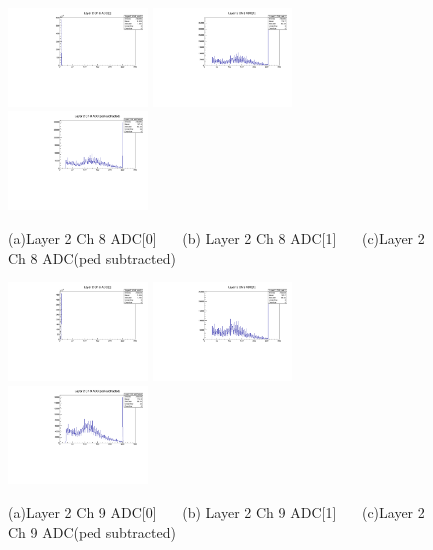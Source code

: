 \documentclass[a4paper,11pt]{article}
\theoremstyle{mytheor}
\begin{document}
\begin{figure}[H] 
\vspace*{-0.3cm} 
\includegraphics[width=0.33\textwidth,scale=0.5,trim=0 0 0 0,clip]{plotsdir/file0_test-Layer2_Ch8_adc0-1.pdf} 
\includegraphics[width=0.33\textwidth,scale=0.5,trim=0 0 0 0,clip]{plotsdir/file0_test-Layer2_Ch8_adc1-1.pdf} 
\includegraphics[width=0.33\textwidth,scale=0.5,trim=0 0 0 0,clip]{plotsdir/file0_test-Layer2_Ch8_adcPedsub-1.pdf} 
\caption{(a)Layer 2 Ch 8 ADC[0] ~~~(b) Layer 2 Ch 8 ADC[1] ~~~(c)Layer 2 Ch 8 ADC(ped subtracted) } 
\end{figure} 
\begin{figure}[H] 
\vspace*{-0.3cm} 
\includegraphics[width=0.33\textwidth,scale=0.5,trim=0 0 0 0,clip]{plotsdir/file0_test-Layer2_Ch9_adc0-1.pdf} 
\includegraphics[width=0.33\textwidth,scale=0.5,trim=0 0 0 0,clip]{plotsdir/file0_test-Layer2_Ch9_adc1-1.pdf} 
\includegraphics[width=0.33\textwidth,scale=0.5,trim=0 0 0 0,clip]{plotsdir/file0_test-Layer2_Ch9_adcPedsub-1.pdf} 
\caption{(a)Layer 2 Ch 9 ADC[0] ~~~(b) Layer 2 Ch 9 ADC[1] ~~~(c)Layer 2 Ch 9 ADC(ped subtracted) } 
\end{figure} 
\end{document}
